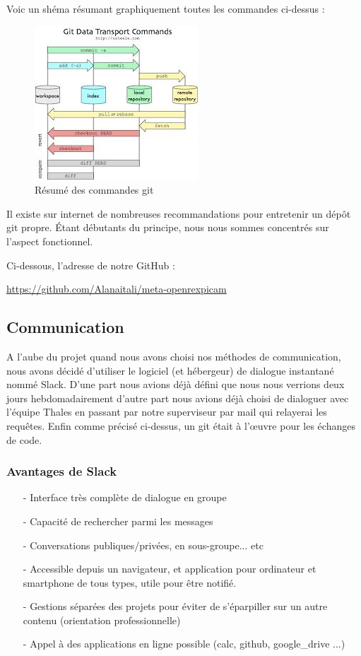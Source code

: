 Voic un shéma résumant graphiquement toutes les commandes ci-dessus :

\begin{figure}[!htb]
    \centering
    \includegraphics[trim={0cm 0cm 0cm 0cm},clip,scale=0.8]{Figures/git.png}
    \decoRule
    \caption{Résumé des commandes git} \label{fig:git}
\end{figure}

Il existe sur internet de nombreuses recommandations pour entretenir un dépôt git propre.
Étant débutants du principe, nous nous sommes concentrés sur l’aspect fonctionnel.

Ci-dessous, l’adresse de notre GitHub :

\href{https://github.com/Alanaitali/meta-openrexpicam}{https://github.com/Alanaitali/meta-openrexpicam}

\subsection{Communication}

A l’aube du projet quand nous avons choisi nos méthodes de communication, nous avons
décidé d'utiliser le logiciel (et hébergeur) de dialogue instantané nommé Slack. D’une part
nous avions déjà défini que nous nous verrions deux jours hebdomadairement d’autre part
nous avions déjà choisi de dialoguer avec l’équipe Thales en passant par notre
superviseur par mail qui relayerai les requêtes. Enfin comme précisé ci-dessus, un git
était à l’œuvre pour les échanges de code.

\subsubsection{Avantages de Slack}

\begin{itemize}
    \item[-] Interface très complète de dialogue en groupe
    \item[-] Capacité de rechercher parmi les messages
    \item[-] Conversations publiques/privées, en sous-groupe... etc
    \item[-] Accessible depuis un navigateur, et application pour ordinateur et smartphone de tous
    types, utile pour être notifié.
    \item[-] Gestions séparées des projets pour éviter de s’éparpiller sur un autre contenu (orientation
    professionnelle)
    \item[-] Appel à des applications en ligne possible (calc, github, google\_drive ...)
\end{itemize}

